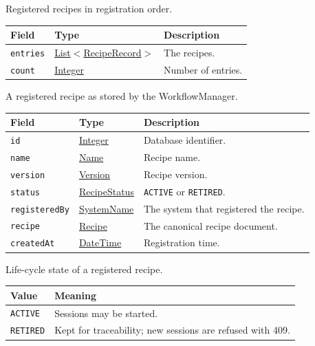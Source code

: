 \documentclass[a4paper]{arrowhead}
\newcommand{\mref}[1]{{\textcolor{ArrowheadPurple}{\hyperref[sec:model:#1]{#1}}}}
\newcommand{\pref}[1]{{\textcolor{ArrowheadGrey}{\hyperref[sec:model:primitives:#1]{#1}}}}
\begin{document}
Registered recipes in registration order.

{\small
\begin{longtable}{|p{3.9cm}|p{4.4cm}|p{7.5cm}|}

\hline
\rowcolor{gray!33} Field & Type & Description \\ \hline
\endhead
\texttt{entries} & \pref{List}$<$\mref{RecipeRecord}$>$ & The recipes. \\ \hline
\texttt{count} & \pref{Integer} & Number of entries. \\ \hline
\end{longtable}
}

A registered recipe as stored by the WorkflowManager.

{\small
\begin{longtable}{|p{3.9cm}|p{4.4cm}|p{7.5cm}|}

\hline
\rowcolor{gray!33} Field & Type & Description \\ \hline
\endhead
\texttt{id} & \pref{Integer} & Database identifier. \\ \hline
\texttt{name} & \pref{Name} & Recipe name. \\ \hline
\texttt{version} & \pref{Version} & Recipe version. \\ \hline
\texttt{status} & \mref{RecipeStatus} & \texttt{ACTIVE} or \texttt{RETIRED}. \\ \hline
\texttt{registeredBy} & \pref{SystemName} & The system that registered the recipe. \\ \hline
\texttt{recipe} & \mref{Recipe} & The canonical recipe document. \\ \hline
\texttt{createdAt} & \pref{DateTime} & Registration time. \\ \hline
\end{longtable}
}

Life-cycle state of a registered recipe.

{\small
\begin{longtable}{|p{3.9cm}|p{11.9cm}|}

\hline
\rowcolor{gray!33} Value & Meaning \\ \hline
\endhead
\texttt{ACTIVE} & Sessions may be started. \\ \hline
\texttt{RETIRED} & Kept for traceability; new sessions are refused with 409. \\ \hline
\end{longtable}
}
\end{document}
